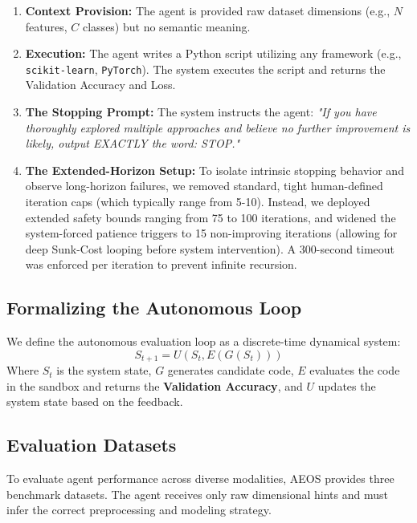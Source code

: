 \documentclass[11pt]{article}
\begin{document}
\begin{enumerate}
    \item \textbf{Context Provision:} The agent is provided raw dataset dimensions (e.g., $N$ features, $C$ classes) but no semantic meaning.
    \item \textbf{Execution:} The agent writes a Python script utilizing any framework (e.g., \texttt{scikit-learn}, \texttt{PyTorch}). The system executes the script and returns the Validation Accuracy and Loss.
    \item \textbf{The Stopping Prompt:} The system instructs the agent: \emph{"If you have thoroughly explored multiple approaches and believe no further improvement is likely, output EXACTLY the word: STOP."}
    \item \textbf{The Extended-Horizon Setup:} To isolate intrinsic stopping behavior and observe long-horizon failures, we removed standard, tight human-defined iteration caps (which typically range from 5-10). Instead, we deployed extended safety bounds ranging from 75 to 100 iterations, and widened the system-forced patience triggers to 15 non-improving iterations (allowing for deep Sunk-Cost looping before system intervention). A 300-second timeout was enforced per iteration to prevent infinite recursion.
\end{enumerate}

\subsection{Formalizing the Autonomous Loop}
We define the autonomous evaluation loop as a discrete-time dynamical system:
\begin{equation}
S_{t+1} = U(S_t, E(G(S_t)))
\end{equation}
Where $S_t$ is the system state, $G$ generates candidate code, $E$ evaluates the code in the sandbox and returns the \textbf{Validation Accuracy}, and $U$ updates the system state based on the feedback.

\subsection{Evaluation Datasets}
To evaluate agent performance across diverse modalities, AEOS provides three benchmark datasets. The agent receives only raw dimensional hints and must infer the correct preprocessing and modeling strategy.
\end{document}
